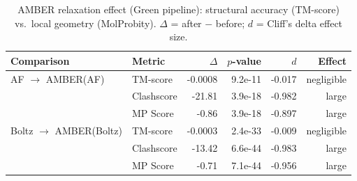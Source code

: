 \begin{table}[htbp]
\centering
\caption{AMBER relaxation effect (Green pipeline): structural accuracy (TM-score) vs.\ local geometry (MolProbity). $\Delta$ = after $-$ before; $d$ = Cliff's delta effect size.}
\label{tab:amber-dual-green}
\begin{tabular}{llrrrr}
\toprule
Comparison & Metric & $\Delta$ & $p$-value & $d$ & Effect \\
\midrule
  AF $\to$ AMBER(AF) & TM-score & -0.0008 & 9.2e-11 & -0.017 & negligible \\
  & Clashscore & -21.81 & 3.9e-18 & -0.982 & large \\
  & MP Score & -0.86 & 3.9e-18 & -0.897 & large \\
  \midrule
  Boltz $\to$ AMBER(Boltz) & TM-score & -0.0003 & 2.4e-33 & -0.009 & negligible \\
  & Clashscore & -13.42 & 6.6e-44 & -0.983 & large \\
  & MP Score & -0.71 & 7.1e-44 & -0.956 & large \\
\bottomrule
\end{tabular}
\end{table}